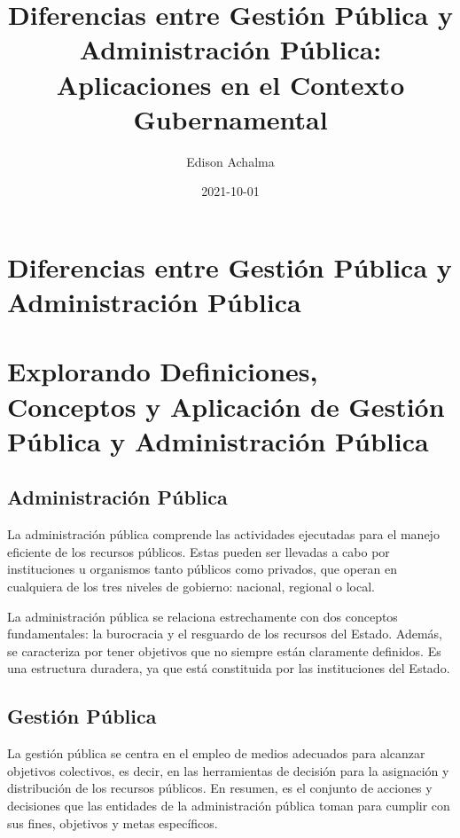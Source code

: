 \documentclass[
  jou,
  floatsintext,
  longtable,
  a4paper,
  nolmodern,
  notxfonts,
  notimes,
  colorlinks=true,linkcolor=blue,citecolor=blue,urlcolor=blue]{apa7}
\title{Diferencias entre Gestión Pública y Administración Pública:
Aplicaciones en el Contexto Gubernamental}
\author{Edison Achalma}
\affiliation{
{Departamento de Economía, Universidad Nacional de San Cristóbal de
Huamanga}}
\date{2021-10-01}
\begin{document}
\maketitle

\hypertarget{toc}{}
\tableofcontents
\newpage
\section[Introduction]{Diferencias entre Gestión Pública y
Administración Pública}

\setcounter{secnumdepth}{-\maxdimen} %

\setlength\LTleft{0pt}


\section{Explorando Definiciones, Conceptos y Aplicación de Gestión
Pública y Administración
Pública}\label{explorando-definiciones-conceptos-y-aplicaciuxf3n-de-gestiuxf3n-puxfablica-y-administraciuxf3n-puxfablica}

\subsection{Administración Pública}\label{administraciuxf3n-puxfablica}

La administración pública comprende las actividades ejecutadas para el
manejo eficiente de los recursos públicos. Estas pueden ser llevadas a
cabo por instituciones u organismos tanto públicos como privados, que
operan en cualquiera de los tres niveles de gobierno: nacional, regional
o local.

La administración pública se relaciona estrechamente con dos conceptos
fundamentales: la burocracia y el resguardo de los recursos del Estado.
Además, se caracteriza por tener objetivos que no siempre están
claramente definidos. Es una estructura duradera, ya que está
constituida por las instituciones del Estado.

\subsection{Gestión Pública}\label{gestiuxf3n-puxfablica}

La gestión pública se centra en el empleo de medios adecuados para
alcanzar objetivos colectivos, es decir, en las herramientas de decisión
para la asignación y distribución de los recursos públicos. En resumen,
es el conjunto de acciones y decisiones que las entidades de la
administración pública toman para cumplir con sus fines, objetivos y
metas específicos.
\end{document}
